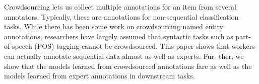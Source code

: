 Crowdsourcing lets us collect multiple annotations for an item from several annotators. Typically, these are annotations for non-sequential classification tasks. While there has been some work on crowdsourcing named entity annotations, researchers have largely assumed that syntactic tasks such as part-of-speech (POS) tagging cannot be crowdsourced. This paper shows that workers can actually annotate sequential data almost as well as experts. Fur- ther, we show that the models learned from crowdsourced annotations fare as well as the models learned from expert annotations in downstream tasks.
